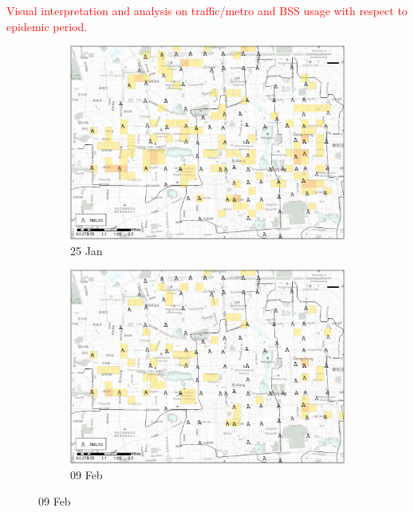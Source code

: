\documentclass[preprints,ijgi,submit,moreauthors]{Definitions/mdpi}
\begin{document}
\textcolor{red}{Visual interpretation and analysis on traffic/metro and BSS usage with respect to epidemic period.}
\begin{figure}[H]
    \centering
    \begin{subfigure}{.45\textwidth}
        \includegraphics[width=\textwidth]{Figures/Relation_with_POIs/POI_metroD2020_01_25.eps}
        \caption{25 Jan}
    \end{subfigure}
    \begin{subfigure}{.45\textwidth}
        \includegraphics[width=\textwidth]{Figures/Relation_with_POIs/POI_metroD2020_02_09.eps}
        \caption{09 Feb}
    \end{subfigure}


\end{figure}
\end{document}
